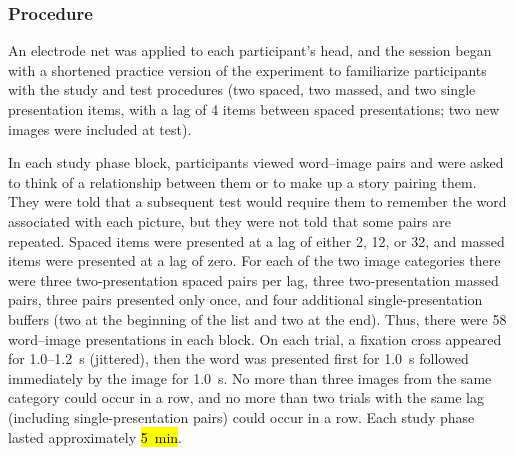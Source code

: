 \subsubsection{Procedure}

An electrode net was applied to each participant's head, and the session began with a shortened practice version of the experiment to familiarize participants with the study and test procedures (two spaced, two massed, and two single presentation items, with a lag of 4 items between spaced presentations; two new images were included at test).




In each study phase block, participants viewed word--image pairs and were asked to think of a relationship between them or to make up a story pairing them.  They were told that a subsequent test would require them to remember the word associated with each picture, but they were not told that some pairs are repeated.  Spaced items were presented at a lag of either 2, 12, or 32, and massed items were presented at a lag of zero.  For each of the two image categories there were three two-presentation spaced pairs per lag, three two-presentation massed pairs, three pairs presented only once, and four additional single-presentation buffers (two at the beginning of the list and two at the end).
Thus, there were 58 word--image presentations in each block.  On each trial, a fixation cross appeared for 1.0--1.2~s (jittered), then the word was presented first for 1.0~s followed immediately by the image for 1.0~s.  No more than three images from the same category could occur in a row, and no more than two trials with the same lag (including single-presentation pairs) could occur in a row.  Each study phase lasted approximately \hl{5~min}.

